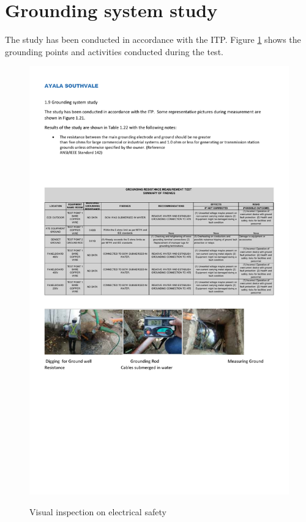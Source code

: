\section{Grounding system study} \label{ch04_elecaudit_groundingsystem}
The study has been conducted in accordance with the ITP. Figure \ref{ch04_fig_grounding} shows the grounding points and activities conducted during the test.


\begin{figure}
	\includegraphics[scale=0.8]{figures/ch04_fig_grounding} \\
	\caption{Visual inspection on electrical safety}
	\label{ch04_fig_grounding} 
\end{figure}

